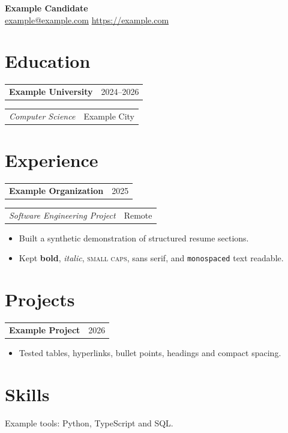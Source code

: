 \documentclass[10pt,letterpaper]{article}
\makeatletter
\newcommand{\entry}[2]{\par\noindent\begin{tabularx}{\linewidth}{@{}Xr@{}}\textbf{#1}& #2\end{tabularx}}
\newcommand{\detail}[2]{\noindent\begin{tabularx}{\linewidth}{@{}Xr@{}}\textit{#1}& #2\end{tabularx}}
\makeatother
\begin{document}
\fontsize{9}{10.3}\selectfont
\begin{center}
{\Large\bfseries Example Candidate}\\
\href{mailto:example@example.com}{example@example.com} \quad \url{https://example.com}
\end{center}
\section{Education}
\entry{Example University}{2024--2026}
\detail{Computer Science}{Example City}
\section{Experience}
\entry{Example Organization}{2025}
\detail{Software Engineering Project}{Remote}
\begin{itemize}
\item Built a synthetic demonstration of structured resume sections.
\item Kept \textbf{bold}, \textit{italic}, \textsc{small caps}, \textsf{sans serif}, and \texttt{monospaced} text readable.
\end{itemize}
\section{Projects}
\entry{Example Project}{2026}
\begin{itemize}
\item Tested tables, hyperlinks, bullet points, headings and compact spacing.
\end{itemize}
\section{Skills}
Example tools: Python, TypeScript and SQL.
\end{document}

